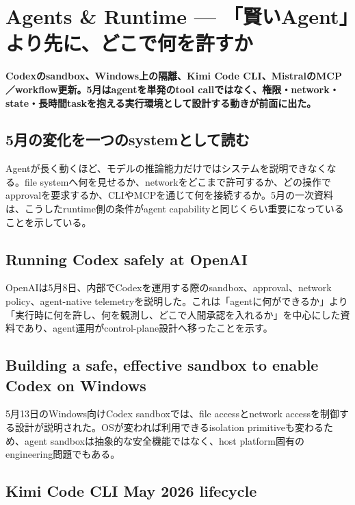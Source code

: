 \section{Agents \& Runtime — 「賢いAgent」より先に、どこで何を許すか}
\noindent\textbf{Codexのsandbox、Windows上の隔離、Kimi Code CLI、MistralのMCP／workflow更新。5月はagentを単発のtool callではなく、権限・network・state・長時間taskを抱える実行環境として設計する動きが前面に出た。}\autocite{src-4a3442a5ca8c,src-66be12207714,src-9191d43918fc,src-ac04c00cf21f,src-d8b7c1c36830}

\subsection{5月の変化を一つのsystemとして読む}

Agentが長く動くほど、モデルの推論能力だけではシステムを説明できなくなる。file systemへ何を見せるか、networkをどこまで許可するか、どの操作でapprovalを要求するか、CLIやMCPを通じて何を接続するか。5月の一次資料は、こうしたruntime側の条件がagent capabilityと同じくらい重要になっていることを示している。\autocite{src-4a3442a5ca8c,src-66be12207714,src-9191d43918fc,src-ac04c00cf21f,src-d8b7c1c36830}


\subsection{Running Codex safely at OpenAI}

OpenAIは5月8日、内部でCodexを運用する際のsandbox、approval、network policy、agent-native telemetryを説明した。これは「agentに何ができるか」より「実行時に何を許し、何を観測し、どこで人間承認を入れるか」を中心にした資料であり、agent運用がcontrol-plane設計へ移ったことを示す。\autocite{src-66be12207714}


\subsection{Building a safe, effective sandbox to enable Codex on Windows}

5月13日のWindows向けCodex sandboxでは、file accessとnetwork accessを制御する設計が説明された。OSが変われば利用できるisolation primitiveも変わるため、agent sandboxは抽象的な安全機能ではなく、host platform固有のengineering問題でもある。\autocite{src-4a3442a5ca8c}


\subsection{Kimi Code CLI May 2026 lifecycle}


